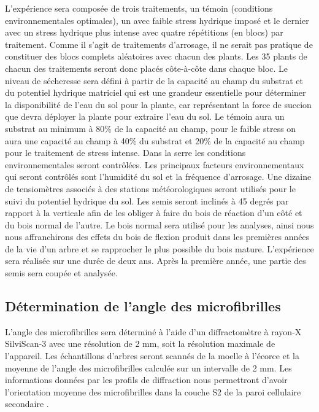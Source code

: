 \documentclass[a4paper,12pt]{report}
\begin{document}
L'expérience sera composée de trois traitements, un témoin (conditions environnementales optimales), un avec faible stress hydrique imposé et le dernier avec un stress hydrique plus intense avec quatre répétitions (en blocs) par traitement. Comme il s'agit de traitements d'arrosage, il ne serait pas pratique de constituer des blocs complets aléatoires avec chacun des plants. Les 35 plants de chacun des traitements seront donc placés côte-à-côte dans chaque bloc. Le niveau de sécheresse sera défini à partir de la capacité au champ du substrat et du potentiel hydrique matriciel qui est une grandeur essentielle pour déterminer la disponibilité de l’eau du sol pour la plante, car représentant la force de succion que devra déployer la plante pour extraire l’eau du sol. Le témoin aura un substrat au minimum à 80\% de la capacité au champ, pour le faible stress on aura une capacité au champ à 40\% du substrat et 20\% de la capacité au champ pour le traitement de stress intense. Dans la serre les conditions environnementales seront contrôlées. Les principaux facteurs environnementaux qui seront contrôlés sont l'humidité du sol et la fréquence d'arrosage. Une dizaine de tensiomètres associés à des stations météorologiques seront utilisés pour le suivi du potentiel hydrique du sol. Les semis seront inclinés à 45 degrés par rapport à la verticale afin de les obliger à faire du bois de réaction d'un côté et du bois normal de l'autre. Le bois normal sera utilisé pour les analyses, ainsi nous nous affranchirons des effets du bois de flexion produit dans les premières années de la vie d'un arbre \citep{Telewski1989} et se rapprocher le plus possible du bois mature. L'expérience sera réalisée sur une durée de deux ans. Après la première année, une partie des semis sera coupée et analysée.


\subsection*{Détermination de l'angle des microfibrilles}
L'angle des microfibrilles sera déterminé à l'aide d'un diffractomètre à rayon-X SilviScan-3 avec une résolution de 2 mm, soit la résolution maximale de l'appareil. Les échantillons d'arbres seront scannés de la moelle à l'écorce et la moyenne de l'angle des microfibrilles calculée sur un intervalle de 2 mm.
Les informations données par les profils de diffraction nous permettront d'avoir l'orientation moyenne des microfibrilles dans la couche S2 de la paroi cellulaire secondaire \citep{Evans1999}.
\end{document}
